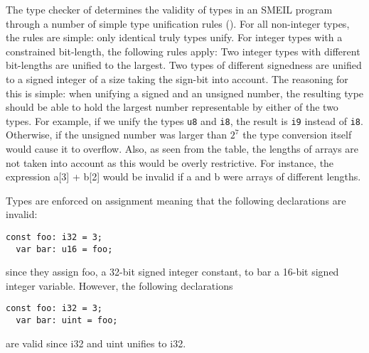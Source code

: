 
The type checker of \libsme{} determines the validity of types in an SMEIL
program through a number of simple type unification rules
(). For all non-integer types, the rules are simple: only
identical truly types unify. For integer types with a constrained bit-length,
the following rules apply: Two integer types with different bit-lengths are
unified to the largest. Two types of different signedness are unified to a
signed integer of a size taking the sign-bit into account. The reasoning for
this is simple: when unifying a signed and an unsigned number, the resulting
type should be able to hold the largest number representable by either of the
two types. For example, if we unify the types \texttt{u8} and \texttt{i8}, the
result is \texttt{i9} instead of \texttt{i8}. Otherwise, if the unsigned number
was larger than $2^7$ the type conversion itself would cause it to
overflow. Also, as seen from the table, the lengths of arrays are not taken into
account as this would be overly restrictive. For instance, the expression
{\ttfamily a[3] + b[2]} would be invalid if {\ttfamily a} and {\ttfamily b} were
arrays of different lengths.

Types are enforced on assignment meaning that the following declarations are
invalid:
\begin{lstlisting}[language=smeil]
  const foo: i32 = 3;
  var bar: u16 = foo;
\end{lstlisting}
since they assign {\ttfamily foo}, a 32-bit signed integer constant, to {\ttfamily bar} a
16-bit signed integer variable. However, the following declarations
\begin{lstlisting}[language=smeil]
  const foo: i32 = 3;
  var bar: uint = foo;
\end{lstlisting}
are valid since {\ttfamily i32} and {\ttfamily uint} unifies to {\ttfamily i32}.




